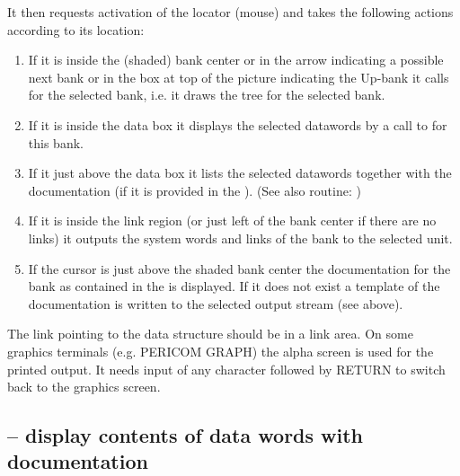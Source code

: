 It then requests activation of the locator (mouse) and takes the
following actions  according to its location:
 
\begin{enumerate}
\item If it is inside the (shaded) bank center or in the
      arrow indicating a possible next bank or in the box at top of
      the picture indicating the Up-bank it calls 
      for the selected bank, i.e. it draws the tree for the selected
      bank.
\item If it is inside the data box it displays the selected datawords
      by a call to  for this bank.
\item If it just above the data box it lists the selected datawords
      together with the documentation (if it is provided in the \RZfile).
      (See also routine: )
\item If it is inside the link region (or just left of the bank
      center if there are no links) it outputs the system words
      and links of the bank to the selected unit.
\item If the cursor is just above the shaded bank center the documentation
      for the bank as contained in the \RZfile{} is displayed. 
      If it does not exist a template of the documentation is written to the selected
      output stream (see  above).
\end{enumerate}
 
\begin{Note}
The link  pointing to the data structure should be in a
link area.
On some graphics terminals (e.g. PERICOM GRAPH) the alpha screen
is used for the printed output. 
It needs input of any character
followed by RETURN to switch back to the graphics screen.
\end{Note}
 
\subsection[{\tt DZDDWD} -- display contents of data words with documentation]%
           { -- display contents of data words with documentation} 
 
 
\Idesc
 
